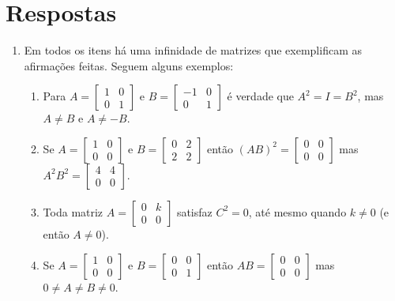 \documentclass[12pt,a4paper]{article}
\begin{document}
\section*{Respostas}
\begin{enumerate}
\item Em todos os itens há uma infinidade de matrizes que exemplificam as afirmações feitas. Seguem alguns exemplos:
\begin{enumerate}
\item Para $A =
\begin{bmatrix}
1 & 0 \\
0 & 1
\end{bmatrix}$ e $B =
\begin{bmatrix}
-1 & 0 \\
 0 & 1
\end{bmatrix}$ é verdade que $A^2 = I = B^2$, mas $A \neq B$ e $A \neq -B$.
\item Se $A =
\begin{bmatrix}
1 & 0 \\
0 & 0
\end{bmatrix}$ e $B =
\begin{bmatrix}
0 & 2 \\
2 & 2
\end{bmatrix}$
então $(AB)^2 = \begin{bmatrix}
0 & 0 \\
0 & 0
\end{bmatrix}$ mas $A^2B^2 = \begin{bmatrix}
4 & 4 \\
0 & 0
\end{bmatrix}$.
\item Toda matriz $A =
\begin{bmatrix}
0 & k \\
0 & 0
\end{bmatrix}$
satisfaz $C^2=0$, até mesmo quando $k \neq 0$ (e então $A \neq 0$).
\item
Se $A =
\begin{bmatrix}
1 & 0 \\
0 & 0
\end{bmatrix}$ e $B =
\begin{bmatrix}
0 & 0 \\
0 & 1
\end{bmatrix}$
então $AB = \begin{bmatrix}
0 & 0 \\
0 & 0
\end{bmatrix}$ mas $0 \neq A \neq B \neq 0$.
\end{enumerate}



\end{enumerate}
\end{document}
